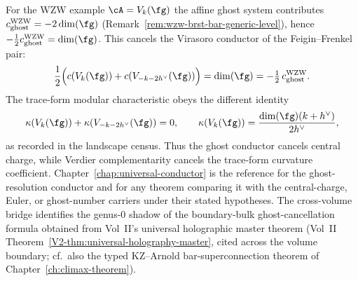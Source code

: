\begin{remark}
For the WZW example $\cA=V_k(\fg)$ the affine ghost system contributes
$c_{\mathrm{ghost}}^{\mathrm{WZW}}=-2\dim(\fg)$
(Remark~\ref{rem:wzw-brst-bar-generic-level}), hence
$-\tfrac12c_{\mathrm{ghost}}^{\mathrm{WZW}}=\dim(\fg)$. This cancels
the Virasoro conductor of the Feigin--Frenkel pair:
\[
 \frac{1}{2}\Bigl(c(V_k(\fg))+c(V_{-k-2h^\vee}(\fg))\Bigr)
 = \dim(\fg)
 = -\tfrac{1}{2}\,c_{\mathrm{ghost}}^{\mathrm{WZW}}.
\]
The trace-form modular characteristic obeys the different identity
\[
 \kappa(V_k(\fg))+\kappa(V_{-k-2h^\vee}(\fg))=0,\qquad
 \kappa(V_k(\fg))=\frac{\dim(\fg)(k+h^\vee)}{2h^\vee},
\]
as recorded in the landscape census. Thus the ghost conductor cancels
central charge, while Verdier complementarity cancels the trace-form
curvature coefficient.
Chapter~\ref{chap:universal-conductor} is the reference for the
ghost-resolution conductor and for any theorem comparing it with the
central-charge, Euler, or ghost-number carriers under their stated
hypotheses. The cross-volume bridge identifies the genus-$0$ shadow of
the boundary-bulk ghost-cancellation formula obtained from Vol~II's
universal holographic master theorem
(Vol~II Theorem~\ref{V2-thm:universal-holography-master}, cited
across the volume boundary; cf.\ also the typed KZ--Arnold
bar-superconnection theorem of Chapter~\ref{ch:climax-theorem}).
\end{remark}

